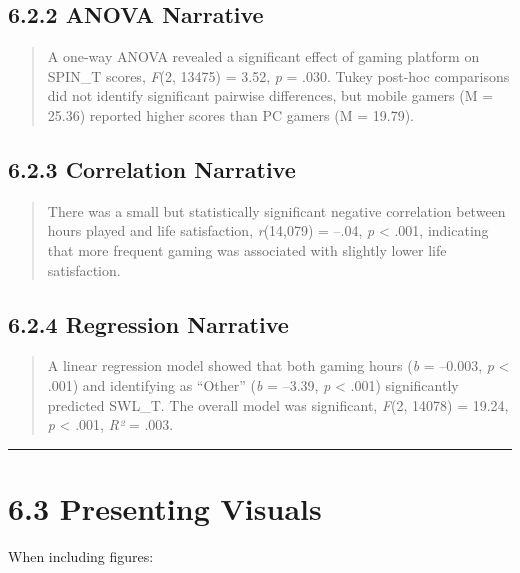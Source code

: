 \documentclass[
]{book}
\begin{document}
\subsection{6.2.2 ANOVA Narrative}\label{anova-narrative}

\begin{quote}
A one-way ANOVA revealed a significant effect of gaming platform on SPIN\_T scores, \emph{F}(2, 13475) = 3.52, \emph{p} = .030. Tukey post-hoc comparisons did not identify significant pairwise differences, but mobile gamers (M = 25.36) reported higher scores than PC gamers (M = 19.79).
\end{quote}

\subsection{6.2.3 Correlation Narrative}\label{correlation-narrative}

\begin{quote}
There was a small but statistically significant negative correlation between hours played and life satisfaction, \emph{r}(14,079) = --.04, \emph{p} \textless{} .001, indicating that more frequent gaming was associated with slightly lower life satisfaction.
\end{quote}

\subsection{6.2.4 Regression Narrative}\label{regression-narrative}

\begin{quote}
A linear regression model showed that both gaming hours (\emph{b} = --0.003, \emph{p} \textless{} .001) and identifying as ``Other'' (\emph{b} = --3.39, \emph{p} \textless{} .001) significantly predicted SWL\_T. The overall model was significant, \emph{F}(2, 14078) = 19.24, \emph{p} \textless{} .001, \emph{R²} = .003.
\end{quote}

\begin{center}\rule{0.5\linewidth}{0.5pt}\end{center}

\section{6.3 Presenting Visuals}\label{presenting-visuals}

When including figures:
\end{document}
